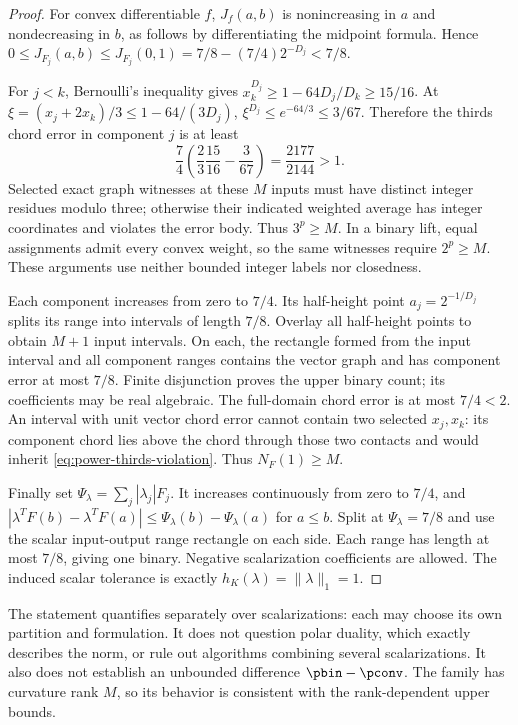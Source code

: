 \begin{proof}
For convex differentiable $f$, $J_f(a,b)$ is nonincreasing in $a$
and nondecreasing in $b$, as follows by differentiating the midpoint
formula. Hence $0\le J_{F_j}(a,b)\le J_{F_j}(0,1)
=7/8-(7/4)2^{-D_j}<7/8$.

For $j<k$, Bernoulli's inequality gives
$x_k^{D_j}\ge1-64D_j/D_k\ge15/16$. At
$\xi=(x_j+2x_k)/3\le1-64/(3D_j)$,
$\xi^{D_j}\le e^{-64/3}\le3/67$. Therefore the thirds chord error
in component $j$ is at least
\begin{equation}\label{eq:power-thirds-violation}
 \frac74\left(\frac23\frac{15}{16}-\frac3{67}\right)
 =\frac{2177}{2144}>1.
\end{equation}
Selected exact graph witnesses at these $M$ inputs must have distinct
integer residues modulo three; otherwise their indicated weighted
average has integer coordinates and violates the error body.
Thus $3^p\ge M$. In a binary lift, equal assignments admit every
convex weight, so the same witnesses require $2^p\ge M$.
These arguments use neither bounded integer labels nor closedness.

Each component increases from zero to $7/4$. Its half-height point
$a_j=2^{-1/D_j}$ splits its range into intervals of length $7/8$.
Overlay all half-height points to obtain $M+1$ input intervals.
On each, the rectangle formed from the input interval and all component
ranges contains the vector graph and has component error at most $7/8$.
Finite disjunction proves the upper binary count; its coefficients may
be real algebraic. The full-domain chord error is at most $7/4<2$.
An interval with unit vector chord error cannot contain two selected
$x_j,x_k$: its component chord lies above the chord through those two
contacts and would inherit \eqref{eq:power-thirds-violation}.
Thus $N_F(1)\ge M$.

Finally set $\Psi_\lambda=\sum_j|\lambda_j|F_j$. It increases
continuously from zero to $7/4$, and
$|\lambda^TF(b)-\lambda^TF(a)|\le\Psi_\lambda(b)-\Psi_\lambda(a)$
for $a\le b$. Split at $\Psi_\lambda=7/8$ and use the scalar
input-output range rectangle on each side. Each range has length at
most $7/8$, giving one binary. Negative scalarization coefficients
are allowed. The induced scalar tolerance is exactly
$h_K(\lambda)=\|\lambda\|_1=1$.
\end{proof}

The statement quantifies separately over scalarizations: each may choose
its own partition and formulation. It does not question polar duality,
which exactly describes the norm, or rule out algorithms combining
several scalarizations. It also does not establish an unbounded difference
$\pbin-\pconv$. The family has curvature rank $M$, so its behavior is
consistent with the rank-dependent upper bounds.

